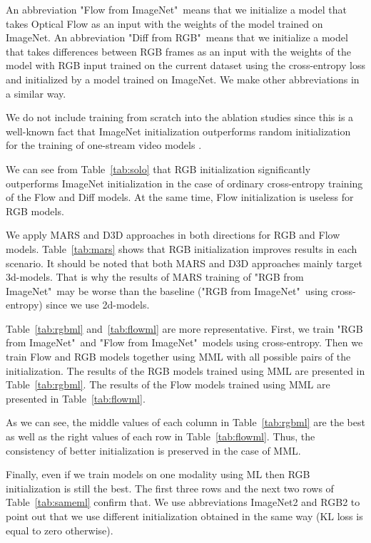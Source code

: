 \documentclass[conference]{IEEEtran}
\begin{document}
An abbreviation "Flow from ImageNet"\ means that we initialize a model that takes Optical Flow as an input with the weights of the model trained on ImageNet. An abbreviation "Diff from RGB"\ means that we initialize a model that takes differences between RGB frames as an input with the weights of the model with RGB input trained on the current dataset using the cross-entropy loss and initialized by a model trained on ImageNet. We make other abbreviations in a similar way.

We do not include training from scratch into the ablation studies since this is a well-known fact that ImageNet initialization outperforms random initialization for the training of one-stream video models \cite{carreira2017quo,lin2019tsm}.

We can see from Table~\ref{tab:solo} that RGB initialization significantly outperforms ImageNet initialization in the case of ordinary cross-entropy training of the Flow and Diff models. At the same time, Flow initialization is useless for RGB models.

We apply MARS \cite{Crasto_2019_CVPR} and D3D \cite{Stroud_2020_WACV} approaches in both directions for RGB and Flow models. Table~\ref{tab:mars} shows that RGB initialization improves results in each scenario. It should be noted that both MARS and D3D approaches mainly target 3d-models. That is why the results of MARS training of "RGB from ImageNet"\ may be worse than the baseline ("RGB from ImageNet"\ using cross-entropy) since we use 2d-models.

Table~\ref{tab:rgbml} and~\ref{tab:flowml} are more representative. First, we train "RGB from ImageNet"\ and "Flow from ImageNet"\ models using cross-entropy. Then we train Flow and RGB models together using MML with all possible pairs of the initialization. The results of the RGB models trained using MML are presented in Table~\ref{tab:rgbml}. The results of the Flow models trained using MML are presented in Table~\ref{tab:flowml}.

As we can see, the middle values of each column in Table~\ref{tab:rgbml} are the best as well as the right values of each row in Table~\ref{tab:flowml}. Thus, the consistency of better initialization is preserved in the case of MML.

Finally, even if we train models on one modality using ML then RGB initialization is still the best. The first three rows and the next two rows of Table~\ref{tab:sameml} confirm that. We use abbreviations ImageNet2 and RGB2 to point out that we use different initialization obtained in the same way (KL loss is equal to zero otherwise).
\end{document}
